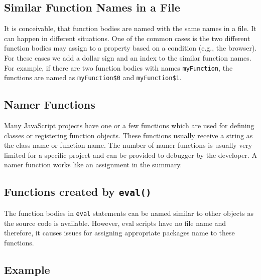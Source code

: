 \documentclass[10pt, preprint]{sigplanconf}
\begin{document}
{\subsection{Similar Function Names in a File}
It is conceivable, that function bodies are named with the same names in a file. It can happen in different situations. One of the common cases is the two different function bodies may assign to a property based on a condition (e.g., the browser). For these cases we add a dollar sign and an index to the similar function names. For example, if there are two function bodies with names {\small\texttt{myFunction}}, the functions are named as {\small\texttt{myFunction\$0}} and {\small\texttt{myFunction\$1}}. 

\subsection{Namer Functions}
Many JavaScript projects have one or a few functions which are used for defining classes or registering function objects. These functions usually receive a string as the class name or function name. The number of namer functions is usually very limited for a specific project and can be provided to debugger by the developer. A namer function works like an assignment in the summary.  



\subsection{Functions created by {\large \texttt{eval()}}}
The function bodies in {\small\texttt{eval}} statements can be named similar to other objects as the source code is available. However, eval scripts have no file name and therefore, it causes issues for assigning appropriate packages name to these functions. 



\subsection{Example}
  
}
\end{document}
